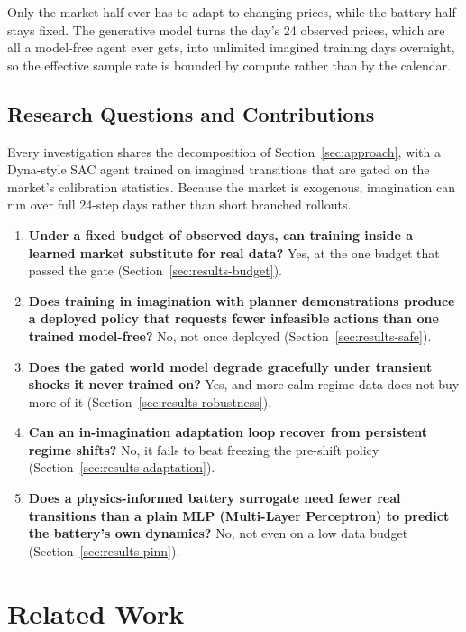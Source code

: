 \documentclass[conference]{IEEEtran}
\begin{document}
Only the market half ever has to adapt to changing prices, while the battery half stays fixed. The generative model turns the day's 24 observed prices, which are all a model-free agent ever gets, into unlimited imagined training days overnight, so the effective sample rate is bounded by compute rather than by the calendar.

\subsection{Research Questions and Contributions}
\label{sec:contributions}

Every investigation shares the decomposition of Section~\ref{sec:approach}, with a Dyna-style SAC agent trained on imagined transitions that are gated on the market's calibration statistics. Because the market is exogenous, imagination can run over full 24-step days rather than short branched rollouts.

\begin{enumerate}
\item \textbf{Under a fixed budget of observed days, can training inside a learned market substitute for real data?} Yes, at the one budget that passed the gate (Section~\ref{sec:results-budget}).
\item \textbf{Does training in imagination with planner demonstrations produce a deployed policy that requests fewer infeasible actions than one trained model-free?} No, not once deployed (Section~\ref{sec:results-safe}).
\item \textbf{Does the gated world model degrade gracefully under transient shocks it never trained on?} Yes, and more calm-regime data does not buy more of it (Section~\ref{sec:results-robustness}).
\item \textbf{Can an in-imagination adaptation loop recover from persistent regime shifts?} No, it fails to beat freezing the pre-shift policy (Section~\ref{sec:results-adaptation}).
\item \textbf{Does a physics-informed battery surrogate need fewer real transitions than a plain MLP (Multi-Layer Perceptron) to predict the battery's own dynamics?} No, not even on a low data budget (Section~\ref{sec:results-pinn}).
\end{enumerate}

\section{Related Work}
\label{sec:related-work}
\end{document}
